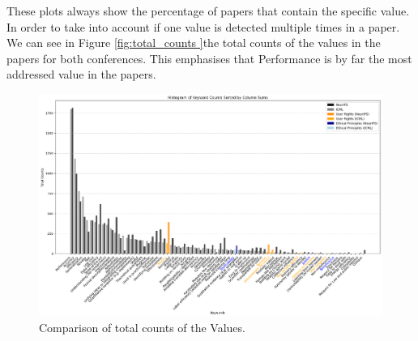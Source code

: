 \documentclass{article}
\begin{document}
These plots always show the percentage of papers that contain the specific value. In order to take into account if one value is detected multiple times in a paper. We can see in Figure \ref{fig:total_counts }the total counts of the values in the papers
for both conferences. This emphasises that Performance is by far the most addressed value in the papers. 
\begin{figure}[H]
    \centering
    \includegraphics[width=\textwidth]{../plots/histogram_keyword_counts_total_number.png}
    \caption{Comparison of total counts of the Values.}
    \label{fig:total_counts}
\end{figure}
\end{document}
